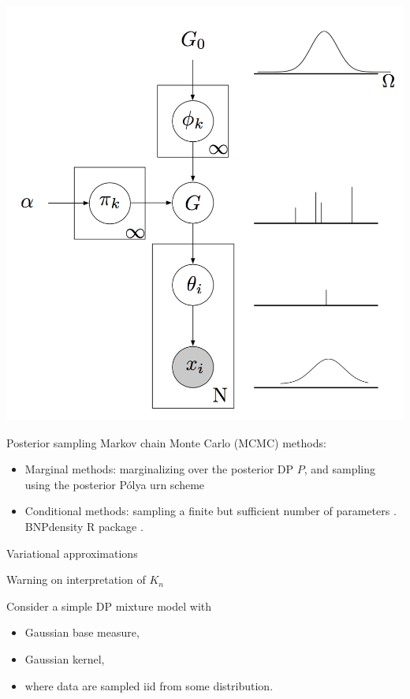 \begin{center}
		\includegraphics[height=.4\textheight]{figures_julyan/mixtures/plate_SB_mixture}
\end{center}




{Posterior sampling}
Markov chain Monte Carlo (MCMC) methods:
\begin{itemize}
\item \alert{Marginal methods}: marginalizing over the posterior DP $P$, and sampling using the posterior P\'olya urn scheme \citep[easy in conjugate case, see][]{neal2000markov}
\item \alert{Conditional methods}: sampling a finite but sufficient number of parameters
 \citep{ishwaran2001gibbs}. \alert{BNPdensity} R package \citep{arbel2021BNPdensity}.
\end{itemize}
Variational approximations \citep{blei2006variational}




{Warning on interpretation of $K_n$}

	Consider a simple DP mixture model with
	\begin{itemize}
		\item  Gaussian base measure, 
		\item Gaussian kernel,
		\item where data are sampled  iid from some distribution.
	\end{itemize}
	
